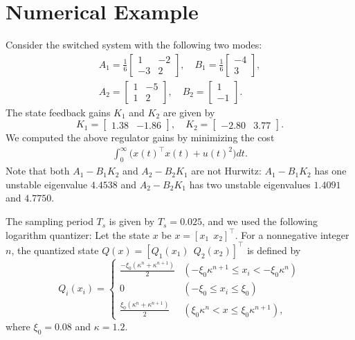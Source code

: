 \documentclass[a4, 11pt]{article}
\begin{document}
 \section{Numerical Example}
Consider the switched system with the following two modes:
\begin{gather*}
A_1 = 
\frac{1}{6}
\begin{bmatrix}
1 & -2\\ -3 & 2
\end{bmatrix}, \quad
B_1 = 
\frac{1}{6}
\begin{bmatrix}
-4 \\ 3
\end{bmatrix}, \\
A_2 = 
\begin{bmatrix}
1 & -5\\ 1 & 2
\end{bmatrix}, \quad
B_2 = 
\begin{bmatrix}
1 \\ -1
\end{bmatrix}.
\end{gather*}
The state feedback gains $K_1$ and $K_2$ are given by
\begin{equation}
\label{eq:state_feedback_gain_Ex}
K_1 = \begin{bmatrix}
1.38 &  -1.86
\end{bmatrix},\quad
K_2 = \begin{bmatrix}
-2.80 &  3.77
\end{bmatrix}.
\end{equation}
We computed the above regulator gains by minimizing the cost
\begin{align*}
\int^{\infty}_{0} \big( x(t)^{\top}x(t) + u(t)^2 \big) dt.
\end{align*}
Note that both $A_1 - B_1K_2$ and $A_2 - B_2K_1$ are not Hurwitz:
$A_1 - B_1K_2$ has one unstable eigenvalue $4.4538$ and
$A_2 - B_2K_1$ has two unstable eigenvalues $1.4091$ and
$4.7750$.

The sampling period $T_s$ is given by $T_s = 0.025$, 
and we used the following logarithm quantizer:
Let the state $x$ be 
$x = [x_1~~x_2]^{\top}$.
For a nonnegative integer $n$, 
the quantized state 
$Q(x) = [Q_1(x_1)~~Q_2(x_2)]^{\top}$
is defined by
\begin{equation*}
Q_i(x_i) =
\begin{cases}
 \frac{-\xi_0 (\kappa^n + \kappa^{n+1})}{2}
&  (-\xi_0 \kappa^{n+1} \leq x_i < -\xi_0\kappa^n)\\ 
0
& (-\xi_0 \leq x_i \leq \xi_0) \\
\frac{\xi_0 (\kappa^n + \kappa^{n+1})}{2}
& (\xi_0\kappa^n < x \leq \xi_0\kappa^{n+1}),
\end{cases}
\end{equation*}
where $\xi_0 = 0.08$ and $\kappa = 1.2$.
\end{document}
